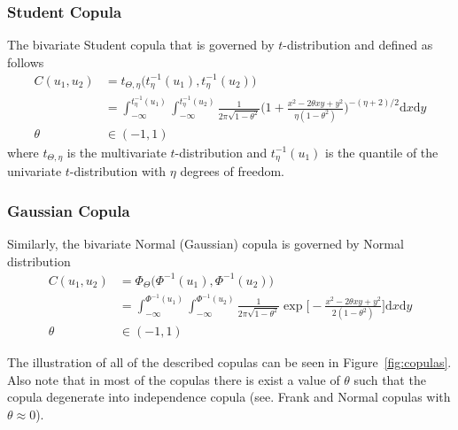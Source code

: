\documentclass[12pt]{article}
\begin{document}
	\subsubsection{Student Copula} The bivariate Student copula that is governed by $ t $-distribution and defined as follows
	\begin{align}
	C(u_1, u_2) &= t_{\Theta, \eta} \big(t^{-1}_\eta(u_1), t^{-1}_\eta(u_2)\big) \\
	&= \int_{-\infty}^{t^{-1}_\eta(u_1)} \int_{-\infty}^{t^{-1}_\eta(u_2)} \frac{1}{2\pi\sqrt{1-\theta^2}}\bigg(1 + \frac{x^2 - 2\theta xy + y^2}{\eta(1-\theta^2)}\bigg)^{-(\eta + 2)/2} \text{d}x \text{d}y \\
	\theta &\in (-1, 1)
	\end{align}
	where $ t_{\Theta, \eta} $ is the multivariate $ t $-distribution and $ t^{-1}_\eta(u_1) $ is the quantile of the univariate $ t $-distribution with $ \eta $ degrees of freedom.
	
	\subsubsection{Gaussian Copula} Similarly, the bivariate Normal (Gaussian) copula is governed by Normal distribution
	\begin{align}
	C(u_1, u_2) &= \Phi_{\Theta}\big(\Phi^{-1}(u_1), \Phi^{-1}(u_2)\big) \\
	&= \int_{-\infty}^{\Phi^{-1}(u_1)} \int_{-\infty}^{\Phi^{-1}(u_2)} \frac{1}{2\pi\sqrt{1-\theta^2}}\exp\bigg[-\frac{x^2 - 2\theta xy + y^2}{2(1-\theta^2)}\bigg] \text{d}x \text{d}y \\
	\theta &\in (-1, 1)
	\end{align}
	
	The illustration of all of the described copulas can be seen in Figure~\ref{fig:copulas}. Also note that in most of the copulas there is exist a value of $ \theta $ such that the copula degenerate into independence copula (see. Frank and Normal copulas with $ \theta \approx 0 $).
	
\end{document}
